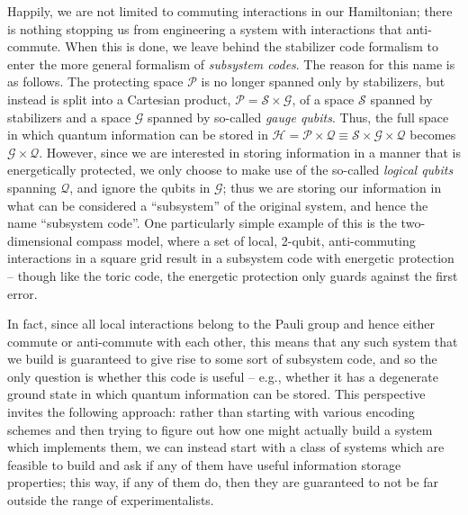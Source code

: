 \documentclass[twocolumn,showpacs,preprintnumbers,amsmath,amssymb,nofootinbib,pra,floatfix]{revtex4}
\begin{document}
Happily, we are not limited to commuting interactions in our Hamiltonian;  there is nothing stopping us from engineering a system with interactions that anti-commute.  When this is done, we leave behind the stabilizer code formalism to enter the more general formalism of \emph{subsystem codes}.  The reason for this name is as follows.  The protecting space $\mathscr{P}$ is no longer spanned only by stabilizers, but instead is split into a Cartesian product, $\mathscr{P}=\mathscr{S}\times\mathscr{G}$, of a space $\mathscr{S}$ spanned by stabilizers and a space $\mathscr{G}$ spanned by so-called \emph{gauge qubits}.  Thus, the full space in which quantum information can be stored in $\mathscr{H}=\mathscr{P}\times\mathscr{Q}\equiv\mathscr{S}\times\mathscr{G}\times\mathscr{Q}$ becomes $\mathscr{G}\times\mathscr{Q}$.  However, since we are interested in storing information in a manner that is energetically protected, we only choose to make use of the so-called \emph{logical qubits} spanning $\mathscr{Q}$, and ignore the qubits in $\mathscr{G}$;  thus we are storing our information in what can be considered a ``subsystem'' of the original system, and hence the name ``subsystem code''.  One particularly simple example of this is the two-dimensional compass model, where a set of local, 2-qubit, anti-commuting interactions in a square grid result in a subsystem code with energetic protection -- though like the toric code, the energetic protection only guards against the first error.

In fact, since all local interactions belong to the Pauli group and hence either commute or anti-commute with each other, this means that any such system that we build is guaranteed to give rise to some sort of subsystem code, and so the only question is whether this code is useful -- e.g., whether it has a degenerate ground state in which quantum information can be stored.  This perspective invites the following approach:  rather than starting with various encoding schemes and then trying to figure out how one might actually build a system which implements them, we can instead start with a class of systems which are feasible to build and ask if any of them have useful information storage properties;  this way, if any of them do, then they are guaranteed to not be far outside the range of experimentalists. 
\end{document}
